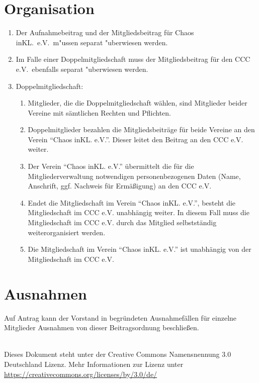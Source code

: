 \documentclass[a4paper, 12pt]{scrartcl}
\begin{document}
\section{Organisation}
\begin{enumerate}
	\item Der Aufnahmebeitrag und der Mitgliedsbeitrag für Chaos inKL.\ e.V.\ m"ussen separat "uberwiesen werden.
	\item Im Falle einer Doppelmitgliedschaft muss der Mitgliedsbeitrag für den CCC e.V.\ ebenfalls separat "uberwiesen werden.
	\item Doppelmitgliedschaft:
\begin{enumerate}
	\item Mitglieder, die die Doppelmitgliedschaft wählen, sind Mitglieder beider Vereine mit sämtlichen Rechten und Pflichten.
	\item Doppelmitglieder bezahlen die Mitgliedsbeiträge für beide Vereine an den Verein "`Chaos inKL. e.V."'. Dieser leitet den Beitrag an den CCC e.V. weiter.
	\item Der Verein "`Chaos inKL. e.V."' übermittelt die für die Mitgliederverwaltung notwendigen personenbezogenen Daten (Name, Anschrift, ggf. Nachweis für Ermäßigung) an den CCC e.V.
	\item Endet die Mitgliedschaft im Verein "`Chaos inKL. e.V."', besteht die Mitgliedschaft im CCC e.V. unabhängig weiter. In diesem Fall muss die Mitgliedschaft im CCC e.V. durch das Mitglied selbstständig weiterorganisiert werden.
	\item Die Mitgliedschaft im Verein "`Chaos inKL. e.V."' ist unabhängig von der Mitgliedschaft im CCC e.V.
\end{enumerate}
\end{enumerate}

\section{Ausnahmen}
Auf Antrag kann der Vorstand in begründeten Ausnahmefällen für einzelne Mitglieder Ausnahmen von dieser Beitragsordnung beschließen.

\vfill

\begin{flushright}
	\ccby \\
	{\small
		Dieses Dokument steht unter der Creative Commons Namensnennung 3.0 Deutschland Lizenz. Mehr Informationen zur Lizenz unter \url{https://creativecommons.org/licenses/by/3.0/de/}
	}
\end{flushright}
\end{document}
